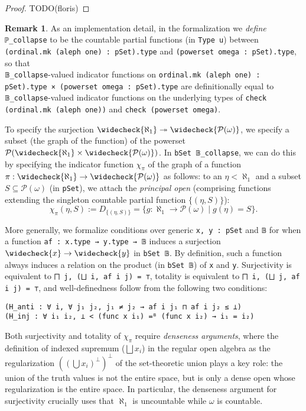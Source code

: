 \documentclass[sigplan,10pt,review, autoref,anonymous]{acmart}
\newcommand{\lil}{\lstinline}
\theoremstyle{definition}
\newtheorem{remark}{Remark}[section]
\begin{document}
\begin{proof}
  TODO(floris)
\end{proof}

\begin{remark}
  As an implementation detail, in the formalization we \emph{define} \lil{ℙ_collapse} to be the countable partial functions (in \lil{Type u}) between \lil{(ordinal.mk (aleph one) : pSet).type} and \lil{(powerset omega : pSet).type}, so that \\ \lil{𝔹_collapse}-valued indicator functions on \lil{ordinal.mk (aleph one) : pSet).type × (powerset omega : pSet).type} are definitionally equal to \lil{𝔹_collapse}-valued indicator functions on the underlying types of \lil{check (ordinal.mk (aleph one))} and \lil{check (powerset omega)}.
\end{remark}

To specify the surjection \(\widecheck{\aleph_1} \twoheadrightarrow \widecheck{\mathcal{P}(\omega)}\), we specify a subset (the graph of the function) of the powerset \(\mathcal{P}(\widecheck{\aleph_1} \times \widecheck{\mathcal{P}(\omega)})\). In \lil{bSet 𝔹_collapse}, we can do this by specifying the indicator function \(\chi_{\pi}\) of the graph of a function \(\pi : \widecheck{\aleph_1} \to \widecheck{\mathcal{P}(\omega)}\) as follows: to an \(\eta < \aleph_1\) and a subset \(S \subseteq \mathcal{P}(\omega)\) (in \lil{pSet}), we attach the \emph{principal open} (comprising functions extending the singleton countable partial function \(\{(\eta, S)\}\)):
\[
  \chi_\pi (\eta, S) := D_{\{(\eta, S)\}} = \{g : \aleph_1 \to \mathcal{P}(\omega) \operatorname{|} g (\eta) = S\}.
\]

More generally, we formalize conditions over generic \lil{x, y : pSet} and \lil{𝔹} for when a function \lil{af : x.type → y.type → 𝔹} induces a surjection \(\widecheck{x} \to \widecheck{y}\) in \lil{bSet 𝔹}. By definition, such a function always induces a relation on the product (in \lil{bSet 𝔹}) of \lil{x} and \lil{y}. Surjectivity is equivalent to \lil{⨅ j, (⨆ i, af i j) = ⊤}, totality is equivalent to \lil{⨅ i, (⨆ j, af i j) = ⊤}, and well-definedness follow from the following two conditions:
\begin{lstlisting}
(H_anti : ∀ i, ∀ j₁ j₂, j₁ ≠ j₂ → af i j₁ ⊓ af i j₂ ≤ ⊥)
(H_inj : ∀ i₁ i₂, ⊥ < (func x i₁) =ᴮ (func x i₂) → i₁ = i₂)
\end{lstlisting}

Both surjectivity and totality of \(\chi_{\pi}\) require \emph{denseness arguments}, where the definition of indexed supremum (\(\bigsqcup x_i\)) in the regular open algebra as the regularization \(((\bigcup x_i)^\perp)^\perp\) of the set-theoretic union plays a key role: the union of the truth values is not the entire space, but is only a dense open whose regularization is the entire space. In particular, the denseness argument for surjectivity crucially uses that \(\aleph_1\) is uncountable while \(\omega\) is countable.
\end{document}
